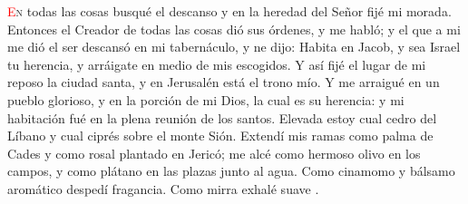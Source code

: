 \lettrine[lines=2]{\textcolor{red}{E}}n todas las cosas busqué el descanso y en la heredad del Señor fijé mi morada. Entonces el Creador de todas las cosas dió sus órdenes, y me habló;
y el que a mi me dió el ser descansó en mi tabernáculo, y ne dijo: Habita en Jacob, y sea Israel tu herencia, y arráigate en medio de mis escogidos. Y así fijé el lugar de mi reposo la
ciudad santa, y en Jerusalén está el trono mío. Y me arraigué en un pueblo glorioso, y en la porción de mi Dios, la cual es su herencia: y mi habitación fué en la plena reunión de los santos.
Elevada estoy cual cedro del Líbano y cual ciprés sobre el monte Sión. Extendí mis ramas como palma de Cades y como rosal plantado en Jericó; me alcé como hermoso olivo en los campos, y como
plátano en las plazas junto al agua. Como cinamomo y bálsamo aromático despedí fragancia. Como mirra exhalé suave .\cite{gubianas-misal}